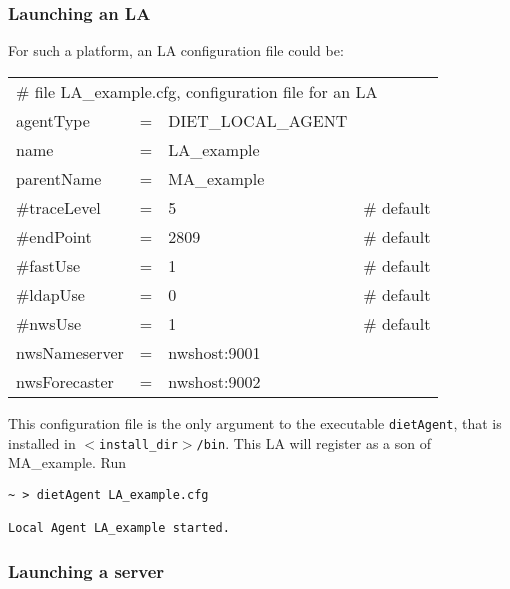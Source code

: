 \subsubsection{Launching an LA}

For such a platform, an LA configuration file could be:
\tt
\begin{center}
 \footnotesize
 \begin{tabular}{lcll}
  \multicolumn{4}{l}{\# file LA\_example.cfg, configuration file for an LA}\\
  agentType    &=&DIET\_LOCAL\_AGENT&\\
  name         &=&LA\_example       &\\
  parentName   &=&MA\_example       &\\
  \#traceLevel &=&5                 &\# default\\
  \#endPoint   &=&2809              &\# default\\
  \#fastUse    &=&1                 &\# default\\
  \#ldapUse    &=&0                 &\# default\\
  \#nwsUse     &=&1                 &\# default\\
  nwsNameserver&=&nwshost:9001      &\\
  nwsForecaster&=&nwshost:9002      &\\
 \end{tabular}
\end{center}
\rm

This configuration file is the only argument to the executable \texttt{dietAgent},
that is installed in \texttt{$<$install\_dir$>$/bin}. This LA will register as a
son of MA\_example. Run
{\footnotesize
\begin{verbatim}
~ > dietAgent LA_example.cfg

Local Agent LA_example started.
\end{verbatim}
}

\subsubsection{Launching a server}

